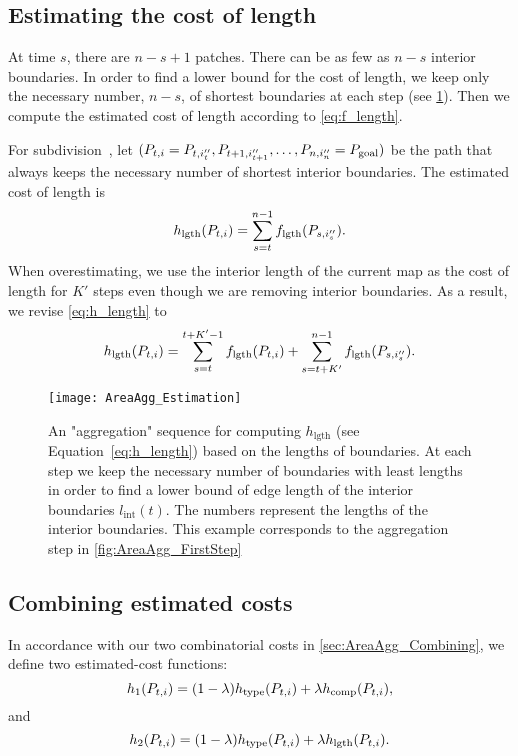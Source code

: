 \documentclass[acmsmall,natbib=false]{acmart}
\begin{document}
\subsection{Estimating the cost of length}
\label{sec:AreaAgg_h_length}

At time $s$, there are $n-s+1$ patches.
There can be as few as $n-s$ interior boundaries.
In order to find a lower bound for the cost of length,
we keep only the necessary number, $n-s$, 
of shortest boundaries at each step
(see \fig\ref{fig:AreaAgg_h_length}).
Then we compute the estimated cost of length according to 
\eq\ref{eq:f_length}.

For subdivision~\Pnode, let
$(P_{t,i}=P_{t,i''_t}, P_{t+1,i''_{t+1}}, \dots,P_{n,i''_n}=P_\mathrm{goal})$
be the path that always keeps 
the necessary number of shortest interior boundaries.
The estimated cost of length is
\begin{equation}
\label{eq:h_length}
h_\mathrm{lgth}(P_{t,i})=
\sum_{s=t}^{n-1}f_\mathrm{lgth}(P_{s,i''_s}).
\end{equation}
When overestimating,
we use the interior length of the current map as the cost of 
length for $K'$ steps even though we are removing 
interior boundaries.
As a result, we revise \fo\ref{eq:h_length} to
\begin{equation}
\label{eq:o_length}
h_\mathrm{lgth}(P_{t,i})=
\sum_{s=t}^{t+K'-1}f_\mathrm{lgth}(P_{t,i})+
\sum_{s=t+K'}^{n-1}f_\mathrm{lgth}(P_{s,i''_s}). \nonumber
\end{equation}


\begin{figure*}[htb]
\centering
\texttt{[image: AreaAgg\_Estimation]}
\caption{An "aggregation" sequence for computing 
	$h_\mathrm{lgth}$ 
	(see Equation~\ref{eq:h_length}) 
	based on the lengths of boundaries. 
	At each step we keep the necessary number 
	of boundaries with least lengths in order to find a 
	lower bound of edge length of the interior boundaries 
	$l_\mathrm{int}(t)$. 
	The numbers represent the 
	lengths of the interior boundaries.
	This example corresponds to the aggregation step in 
	\fig\ref{fig:AreaAgg_FirstStep}
}
\label{fig:AreaAgg_h_length}
\end{figure*}


\subsection{Combining estimated costs}
\label{sec:AreaAgg_CombinationEstimated}
In accordance 
with our two combinatorial costs in 
\sect\ref{sec:AreaAgg_Combining},
we define two estimated-cost functions:
\begin{equation}
\label{eq:h_1}
h_1(P_{t,i})=
(1-\lambda)h_\mathrm{type}(P_{t,i})
+\lambda h_{\mathrm{comp}}(P_{t,i}), \nonumber
\end{equation}
and
\begin{equation}
\label{eq:h_2}
h_2(P_{t,i})=
(1-\lambda)h_\mathrm{type}(P_{t,i})
+\lambda h_{\mathrm{lgth}}(P_{t,i}). \nonumber
\end{equation}
\end{document}
